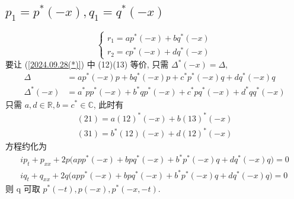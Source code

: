 \subsection{$ p_1 = p^{*}(-x), q_1 = q^{*}(-x) $}
\begin{equation}
    \begin{cases}
        r_1 = ap^{*}(-x) + bq^{*}(-x) \\
        r_2 = cp^{*}(-x) + dq^{*}(-x)
    \end{cases}
\end{equation}
要让 (\ref{2024.09.28(*)}) 中 (12)(13) 等价, 只需 $ \Delta^{*}(-x) = \Delta $, 
\begin{equation*}
    \begin{aligned}
        \Delta &= ap^{*}(-x)p + bq^{*}(-x)p + c^{*}p^{*}(-x)q + dq^{*}(-x)q \\
        \Delta^{*}(-x) &= a^{*}pp^{*}(-x) + b^{*}qp^{*}(-x) + c^{*}pq^{*}(-x) + d^{*}qq^{*}(-x) 
    \end{aligned}
\end{equation*}
只需 $ a,d \in \mathbb{R}, b = c^{*} \in \mathbb{C} $, 此时有
\begin{equation*}
    \begin{aligned}
        (21) = a(12)^{*}(-x) + b(13)^{*}(-x) \\
        (31) = b^{*}(12)(-x) + d(12)^{*}(-x)
    \end{aligned}
\end{equation*}
方程约化为
\begin{equation*}
    \begin{aligned}
        ip_{t} + p_{xx} + 2p \big(app^{*}(-x) + bpq^{*}(-x) + b^{*}p^{*}(-x)q + dq^{*}(-x)q \big) = 0\\
        iq_{t} + q_{xx} + 2q \big(app^{*}(-x) + bpq^{*}(-x) + b^{*}p^{*}(-x)q + dq^{*}(-x)q \big) = 0
    \end{aligned}
\end{equation*}
则 q 可取 $ p^{*}(-t), p(-x), p^{*}(-x,-t) $. 

